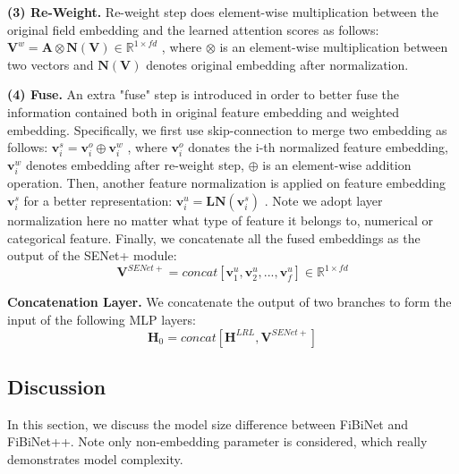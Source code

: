 \documentclass[sigconf]{acmart}
\begin{document}
\textbf{(3) Re-Weight.} Re-weight step does element-wise multiplication between the original field embedding and the learned attention scores as follows:
$\mathbf{V}^w = \mathbf{A}\otimes\mathbf{N}(\mathbf{V})\in \mathbb{R}^{1\times fd}$
, where  $\otimes$ is an element-wise multiplication between two vectors and $\mathbf{N}(\mathbf{V})$ denotes original embedding after normalization.

\textbf{(4) Fuse.} An extra "fuse" step is introduced in order to better fuse the information contained both in original feature embedding and weighted embedding. Specifically, we first use skip-connection to merge two embedding as follows:
$\mathbf{v}_i^s = \mathbf{v}_i^o\oplus\mathbf{v}_i^w$
, where $\mathbf{v}_i^o$ donates the i-th normalized feature embedding, $\mathbf{v}_i^w$ denotes embedding after re-weight step, $\oplus$ is an element-wise addition operation. Then, another feature normalization is applied on feature embedding $\mathbf{v}_i^s$ for a better representation:
$\mathbf{v}_i^u = \mathbf{LN}(\mathbf{v}_i^s)$
. Note we adopt layer normalization here no matter what type of feature it belongs to, numerical  or categorical feature. Finally, we concatenate all the fused embeddings as the output of the SENet+ module:
      \begin{equation}
         \mathbf{V}^{SENet+}= concat[\mathbf{v}_1^u,\mathbf{v}_2^u,...,\mathbf{v}_f^u]\in \mathbb{R}^{1\times fd}
    \end{equation}

\textbf{Concatenation Layer.}
We concatenate the output of two branches to form the input of the following MLP layers:
\begin{equation}
\mathbf{H}_0 = concat[\mathbf{H}^{LRL},\mathbf{V}^{SENet+}]
\end{equation}


\subsection{Discussion}
In this section, we discuss the model size difference  between FiBiNet and FiBiNet++. Note only non-embedding parameter is considered, which really demonstrates model complexity.
\end{document}
